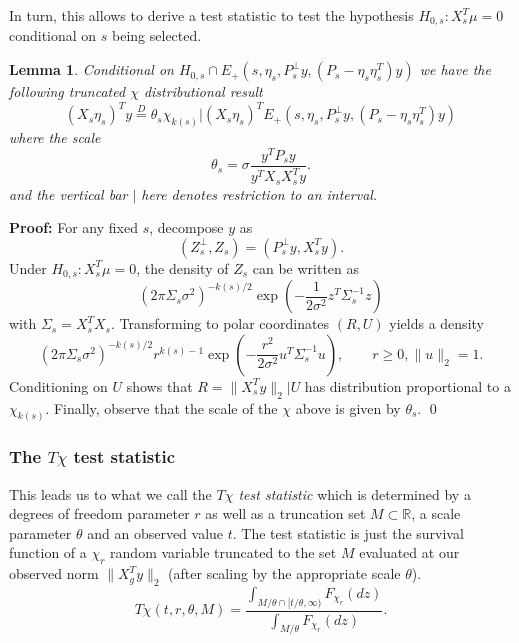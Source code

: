 \documentclass{imsart}
\newcommand{\real}{\mathbb{R}}
\newtheorem{lemma}[theorem]{Lemma}
\begin{document}
In turn, this allows to derive a test statistic to test the hypothesis
$H_{0,s}:X_s^T\mu=0$ conditional on $s$ being selected.
\begin{lemma}
\label{eq:test:dbn}
Conditional on $H_{0,s} \cap E_+(s, \eta_s, P_s^{\perp}y, (P_s - \eta_s\eta_s^T)y)$
we have the following truncated $\chi$ distributional result
\begin{equation}
\label{eq:chi:truncated}
(X_s\eta_s)^Ty \overset{D}{=} \theta_s \chi_{k(s)} | (X_s\eta_s)^TE_+(s, \eta_s, P_s^{\perp}y, (P_s - \eta_s\eta_s^T)y) 
\end{equation}
where the scale 
$$
\theta_s = \sigma \frac{y^TP_sy}{y^TX_sX_s^Ty}.
$$
and the vertical bar $|$ here denotes restriction to an interval.
\end{lemma}

{\bf Proof:}
For any fixed $s$, decompose $y$ as
$$
(Z^{\perp}_s,Z_s) = (P_s^{\perp}y, X_s^Ty).
$$
Under $H_{0,s}:X_s^T\mu=0$, the density of $Z_s$ can be written as
$$
(2 \pi \Sigma_s \sigma^2)^{-k(s)/2} \exp \left(-\frac{1}{2 \sigma^2} z^T\Sigma_s^{-1}z \right)
$$
with $\Sigma_s = X_s^TX_s$.
Transforming to polar coordinates $(R,U)$ yields a density
$$
(2 \pi \Sigma_s \sigma^2)^{-k(s)/2} r^{k(s)-1} \exp \left(-\frac{r^2}{2 \sigma^2} u^T\Sigma_s^{-1}u \right), \qquad r \geq 0, \|u\|_2=1.
$$
Conditioning on $U$ shows that $R=\|X_s^Ty\|_2|U$ has distribution proportional to a $\chi_{k(s)}$. Finally, observe that 
the scale of the $\chi$ above is given by $\theta_s$. \qed

\subsubsection{The $T\chi$ test statistic}

This leads us to what we call the {\em  $T\chi$ test statistic} which is determined by
a degrees of freedom parameter $r$ as well as a truncation set
$M \subset \real$, a scale parameter $\theta$ and an observed value $t$.
The test statistic is just the survival function of a $\chi_r$ random variable
truncated to the set $M$ evaluated at our observed 
norm $\|X_g^Ty\|_2$ (after scaling by the appropriate scale $\theta$).
\begin{equation}
\label{eq:tchi}
T\chi(t, r, \theta,  M) = \frac{\int_{M /\theta \cap [t/\theta,\infty)} F_{\chi_r}(dz)}{\int_{M / \theta} F_{\chi_r}(dz)}.
\end{equation}


\end{document}
